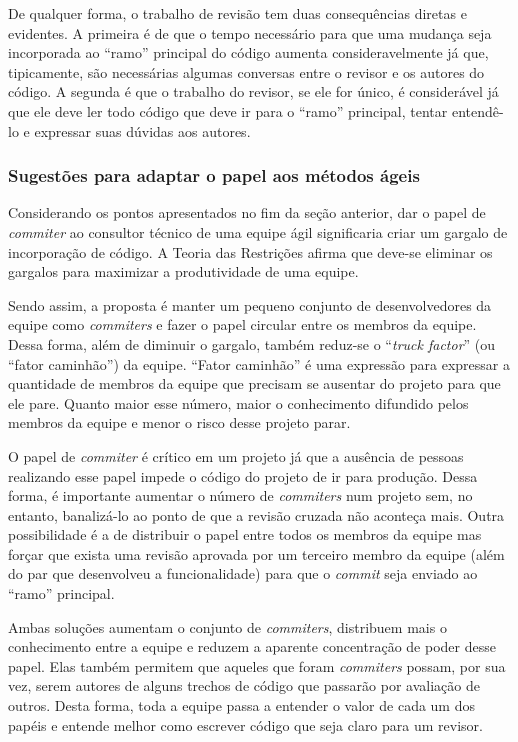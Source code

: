 De qualquer forma, o trabalho de revisão tem duas consequências
diretas e evidentes. A primeira é de que o tempo necessário para que
uma mudança seja incorporada ao ``ramo'' principal do código aumenta
consideravelmente já que, tipicamente, são necessárias algumas
conversas entre o revisor e os autores do código. A segunda é que o
trabalho do revisor, se ele for único, é considerável já que ele deve
ler todo código que deve ir para o ``ramo'' principal, tentar
entendê-lo e expressar suas dúvidas aos autores.

\subsubsection{Sugestões para adaptar o papel aos métodos ágeis}

Considerando os pontos apresentados no fim da seção anterior, dar o
papel de \emph{commiter} ao consultor técnico de uma equipe ágil
significaria criar um gargalo de incorporação de código. A Teoria das
Restrições \cite{goldratt84} afirma que deve-se eliminar os gargalos
para maximizar a produtividade de uma equipe.

Sendo assim, a proposta é manter um pequeno conjunto de
desenvolvedores da equipe como \emph{commiters} e fazer o papel
circular entre os membros da equipe. Dessa forma, além de diminuir o
gargalo, também reduz-se o ``\textit{truck
  factor}''\cite{Williams2002} (ou ``fator caminhão'') da
equipe. ``Fator caminhão'' é uma expressão para expressar a quantidade
de membros da equipe que precisam se ausentar do projeto para que ele
pare. Quanto maior esse número, maior o conhecimento difundido pelos
membros da equipe e menor o risco desse projeto parar.

O papel de \emph{commiter} é crítico em um projeto já que a ausência
de pessoas realizando esse papel impede o código do projeto de ir para
produção. Dessa forma, é importante aumentar o número de
\emph{commiters} num projeto sem, no entanto, banalizá-lo ao ponto de
que a revisão cruzada não aconteça mais. Outra possibilidade é a de
distribuir o papel entre todos os membros da equipe mas forçar que
exista uma revisão aprovada por um terceiro membro da equipe (além do
par que desenvolveu a funcionalidade) para que o \emph{commit} seja
enviado ao ``ramo'' principal.

Ambas soluções aumentam o conjunto de \emph{commiters}, distribuem
mais o conhecimento entre a equipe e reduzem a aparente concentração
de poder desse papel. Elas também permitem que aqueles que foram
\emph{commiters} possam, por sua vez, serem autores de alguns trechos
de código que passarão por avaliação de outros. Desta forma, toda a
equipe passa a entender o valor de cada um dos papéis e entende melhor
como escrever código que seja claro para um revisor.

